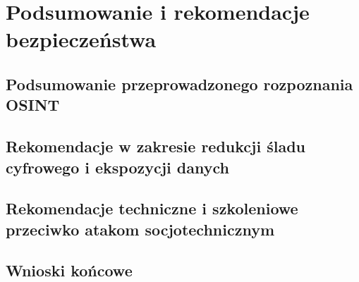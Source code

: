 \chapter{Podsumowanie i rekomendacje bezpieczeństwa}\label{ch:podsumowanie}

\section{Podsumowanie przeprowadzonego rozpoznania OSINT}\label{sec:podsumowanie-osint}

\section{Rekomendacje w zakresie redukcji śladu cyfrowego i ekspozycji danych}\label{sec:rekomendacje-osint}

\section{Rekomendacje techniczne i szkoleniowe przeciwko atakom socjotechnicznym}\label{sec:rekomendacje-socjo}

\section{Wnioski końcowe}\label{sec:wnioski-koncowe}

